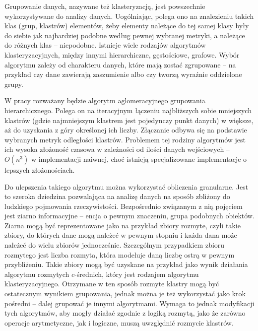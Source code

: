 \documentclass[a4paper,twoside,12pt]{book}
\begin{document}
Grupowanie danych, nazywane też klasteryzacją, jest powszechnie wykorzystywane do analizy danych. Uogólniając, polega ono na znalezieniu takich klas (grup, klastrów) elementów, żeby elementy należące do tej samej klasy były do siebie jak najbardziej podobne według pewnej wybranej metryki, a należące do różnych klas -- niepodobne. Istnieje wiele rodzajów algorytmów klasteryzacyjnych, między innymi hierarchiczne, gęstościowe, grafowe. Wybór algorytmu zależy od charakteru danych, które mają zostać zgrupowane -- na przykład czy dane zawierają zaszumienie albo czy tworzą wyraźnie oddzielone grupy.

W pracy rozważany będzie algorytm aglomeracyjnego grupowania hierarchicznego. Polega on na iteracyjnym łączeniu najbliższych sobie mniejszych klastrów (gdzie najmniejszym klastrem jest pojedynczy punkt danych) w większe, aż do uzyskania z góry określonej ich liczby. Złączanie odbywa się na podstawie wybranych metryk odległości klastrów. Problemem tej rodziny algorytmów jest ich wysoka złożoność czasowa w zależności od ilości danych wejściowych -- $O(n^3)$ w implementacji naiwnej, choć istnieją specjalizowane implementacje o lepszych złożonościach.  

Do ulepszenia takiego algorytmu można wykorzystać obliczenia granularne. Jest to szeroka dziedzina pozwalająca na analizę danych na sposób zbliżony do ludzkiego pojmowania rzeczywistości. Bezpośrednio związanym z nią pojęciem jest ziarno informacyjne -- encja o pewnym znaczeniu, grupa podobnych obiektów. Ziarna mogą być reprezentowane jako na przykład zbiory rozmyte, czyli takie zbiory, do których dane mogą należeć w pewnym stopniu i każda dana może należeć do wielu zbiorów jednocześnie. Szczególnym przypadkiem zbioru rozmytego jest liczba rozmyta, która modeluje daną liczbę ostrą w pewnym przybliżeniu.
%
Takie zbiory mogą być uzyskane na przykład jako wynik działania algorytmu rozmytych $c$-średnich, który jest rodzajem algorytmu klasteryzacyjnego. Otrzymane w ten sposób rozmyte klastry mogą być ostatecznym wynikiem grupowania, jednak można je też wykorzystać jako krok pośredni -- dalej grupować je innymi algorytmami. Wymaga to jednak modyfikacji tych algorytmów, aby mogły działać zgodnie z logiką rozmytą, jako że zarówno operacje arytmetyczne, jak i logiczne, muszą uwzględnić rozmycie klastrów. 

\end{document}
